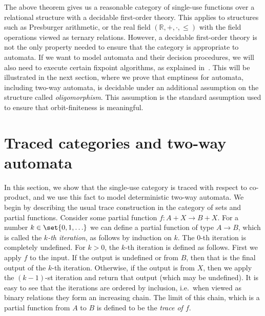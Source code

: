 The above theorem gives us a reasonable category of single-use functions over a relational structure with a decidable first-order theory. This applies to structures such as Presburger arithmetic, or the real field $(\mathbb R, +, \cdot, \leq)$ with the field operations viewed as ternary relations. 
However, a decidable first-order theory is not the only property needed to ensure that the category is appropriate to automata. If we want to model automata and their decision procedures, we will also need to execute certain fixpoint algorithms, as explained in~\cite{bojanczyk_slightly2018}. This will be illustrated in the next section, where we prove that emptiness for automata, including two-way automata, is decidable under an additional assumption on the structure called \emph{oligomorphism}. This assumption is the standard assumption used to ensure that orbit-finiteness is meaningful. 


% 
\section{Traced categories and two-way automata}
\label{sec:two-way-automata}

In this section, we show that the single-use category is traced with respect to co-product, and we use this fact to model deterministic two-way automata.
We begin by describing the usual trace construction in the category of sets and partial functions. 
Consider some partial function $
f : A + X \to B + X.$
For a number $k \in \set{0,1,\ldots}$ we can define a partial function of type $A \to B$, which is called the \emph{$k$-th iteration}, as  follows by induction on $k$. The $0$-th iteration is  completely undefined. For $k > 0$, the $k$-th iteration is defined as follows. First we apply $f$ to the input. If the output is undefined or from  $B$, then that is the final output of the $k$-th iteration. Otherwise, if the output is from $X$, then we apply the $(k-1)$-st iteration and return that output (which may be undefined). It is easy to see that the iterations are ordered by inclusion, i.e.~when viewed as binary relations they form an increasing chain. The limit of this chain, which is a partial function from $A$ to $B$ is defined to be the \emph{trace of $f$}. 

